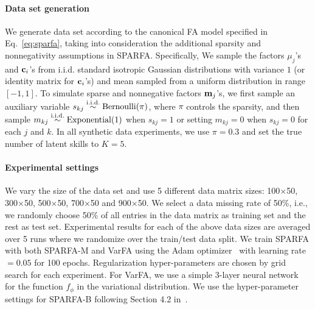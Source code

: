\documentclass{edm_article}
\begin{document}
\paragraph{Data set generation} We generate data set according to the canonical FA model specified in Eq.~\ref{eq:sparfa}, taking into consideration the additional sparsity and nonnegativity assumptions in SPARFA. Specifically, We sample the factors $\mu_j$'s and ${\mathbf{c}}_i$'s from i.i.d. standard isotropic Gaussian distributions with variance $1$ (or identity matrix for ${\mathbf{c}}_i$'s) and mean sampled from a uniform distribution in range $[-1, 1]$. To simulate sparse and nonnegative factors ${\mathbf{m}}_j$'s, we first sample an auxiliary variable $s_{kj}\stackrel{\rm\tiny i.i.d.}{\sim}{\rm Bernoulli}(\pi)$, where $\pi$ controls the sparsity, and then sample $m_{kj}\stackrel{\rm\tiny i.i.d.}{\sim}{\rm Exponential}(1)$ when $s_{kj}=1$ or setting $m_{kj}=0$ when $s_{kj}=0$ for each $j$ and $k$. In all synthetic data experiments, we use $\pi=0.3$ and set the true number of latent skills to $K=5$. 

\vspace{-10pt}
\paragraph{Experimental settings} 
We vary the size of the data set and use 5 different data matrix sizes: 100$\times$50, 300$\times$50, 500$\times$50, 700$\times$50 and 900$\times$50. We select a data missing rate of 50\%, i.e., we randomly choose 50\% of all entries in the data matrix as training set and the rest as test set. 
Experimental results for each of the above data sizes are averaged over 5 runs where we randomize over the train/test data split. 
We train SPARFA with both SPARFA-M and VarFA using the Adam optimizer~\cite{kingma2014adam} with learning rate $=0.05$ for 100 epochs. Regularization hyper-parameters are chosen by grid search for each experiment. For VarFA, we use a simple 3-layer neural network for the function $f_\phi$ in the variational distribution. 
We use the hyper-parameter settings for SPARFA-B following Section 4.2 in~\cite{lan14a}. 

\end{document}

